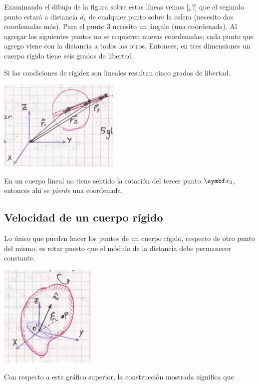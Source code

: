 \documentclass[10pt,oneside]{CBFT_book}
\begin{document}
Examinando el dibujo de la figura sobre estas líneas vemos [¿?] que el segundo punto estará a distancia $d_1$ de
cualquier punto sobre la esfera (necesito dos coordenadas más). Para el punto 3 necesito un ángulo (una coordenada).
Al agregar los siguientes puntos no se requieren nuevas coordenadas; cada punto que agrego viene con la distancia a
todos los otros. Entonces, en tres dimensiones un cuerpo rígido tiene seis grados de libertad.

Si las condiciones de rigidez son lineales resultan cinco grados de libertad.

\includegraphics[scale=0.4]{images/fig_mc_rigid_body_7.jpg}

En un cuerpo lineal no tiene sentido la rotación del tercer punto $\vb{x}_3$, entonces ahi se {\it pierde} una
coordenada.


\subsection{Velocidad de un cuerpo rígido}

Lo único que pueden hacer los puntos de un cuerpo rígido, respecto de otro punto del mismo, es rotar puesto que
el módulo de la distancia debe permanecer constante.

\includegraphics[scale=0.4]{images/fig_mc_rigid_body_vel1.jpg}

Con respecto a este gráfico superior, la construcción mostrada significa que 
\end{document}
